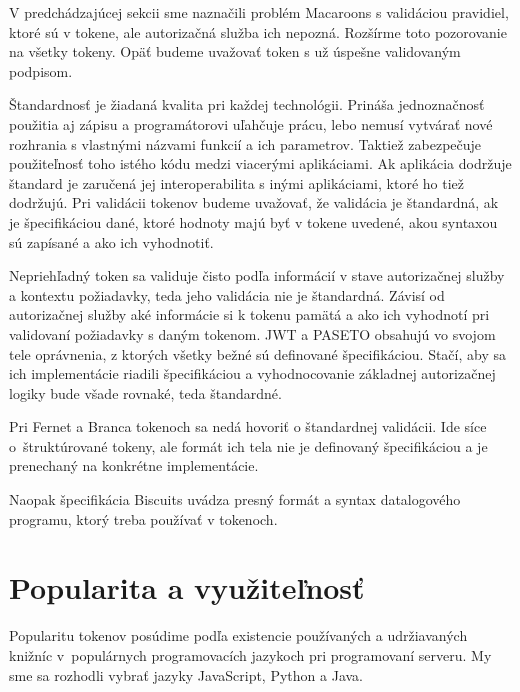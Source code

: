 V predchádzajúcej sekcii sme naznačili problém Macaroons s validáciou pravidiel, ktoré sú v tokene, ale autorizačná služba ich nepozná. Rozšírme toto pozorovanie na všetky tokeny. Opäť budeme uvažovať token s už úspešne validovaným podpisom.

Štandardnosť je žiadaná kvalita pri každej technológii. Prináša jednoznačnosť použitia aj zápisu a programátorovi uľahčuje prácu, lebo nemusí vytvárať nové rozhrania s vlastnými názvami funkcií a ich parametrov. Taktiež zabezpečuje použiteľnosť toho istého kódu medzi viacerými aplikáciami. Ak aplikácia dodržuje štandard je zaručená jej interoperabilita s inými aplikáciami, ktoré ho tiež dodržujú. Pri validácii tokenov budeme uvažovať, že validácia je štandardná, ak je špecifikáciou dané, ktoré hodnoty majú byť v tokene uvedené, akou syntaxou sú zapísané a ako ich vyhodnotiť.

Nepriehľadný token sa validuje čisto podľa informácií v stave autorizačnej služby a kontextu požiadavky, teda jeho validácia nie je štandardná. Závisí od autorizačnej služby aké informácie si k tokenu pamätá a ako ich vyhodnotí pri validovaní požiadavky s daným tokenom. JWT a PASETO obsahujú vo svojom tele oprávnenia, z ktorých všetky bežné sú definované špecifikáciou. Stačí, aby sa ich implementácie riadili špecifikáciou a vyhodnocovanie základnej autorizačnej logiky bude všade rovnaké, teda štandardné.

Pri Fernet a Branca tokenoch sa nedá hovoriť o štandardnej validácii. Ide síce o~štruktúrované tokeny, ale formát ich tela nie je definovaný špecifikáciou a je prenechaný na konkrétne implementácie.

Naopak špecifikácia Biscuits uvádza presný formát a syntax datalogového programu, ktorý treba používať v tokenoch.

\section{Popularita a využiteľnosť}

Popularitu tokenov posúdime podľa existencie používaných a udržiavaných knižníc v~populárnych programovacích jazykoch pri programovaní serveru. My sme sa rozhodli vybrať jazyky JavaScript, Python a Java.

